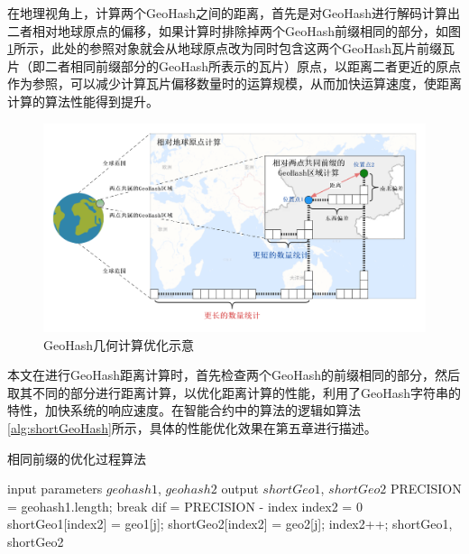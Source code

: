 在地理视角上，计算两个GeoHash之间的距离，首先是对GeoHash进行解码计算出二者相对地球原点的偏移，如果计算时排除掉两个GeoHash前缀相同的部分，如图\ref{fig:calBetter}所示，此处的参照对象就会从地球原点改为同时包含这两个GeoHash瓦片前缀瓦片（即二者相同前缀部分的GeoHash所表示的瓦片）原点，以距离二者更近的原点作为参照，可以减少计算瓦片偏移数量时的运算规模，从而加快运算速度，使距离计算的算法性能得到提升。\par

\begin{figure}
  \centering
  \includegraphics[width=1.0\textwidth]{figures/GeoHash计算优化}
  \caption{GeoHash几何计算优化示意}\label{fig:calBetter}
\end{figure}

本文在进行GeoHash距离计算时，首先检查两个GeoHash的前缀相同的部分，然后取其不同的部分进行距离计算，以优化距离计算的性能，利用了GeoHash字符串的特性，加快系统的响应速度。在智能合约中的算法的逻辑如算法\ref{alg:shortGeoHash}所示，具体的性能优化效果在第五章进行描述。\par

\begin{algorithm}[t]
  \caption{相同前缀的优化过程算法}
  \label{alg:shortGeoHash}
  \begin{algorithmic}[1]
  \REQUIRE input parameters $geohash1$, $geohash2$
  \ENSURE output $shortGeo1$, $shortGeo2$
  \STATE PRECISION = geohash1.length;
      \STATE break
    \ENDIF
  \ENDFOR
  \STATE dif = PRECISION - index
  \STATE index2 = 0
    \STATE shortGeo1[index2] = geo1[j];
    \STATE shortGeo2[index2] = geo2[j];
    \STATE index2++;
  \ENDFOR
  \RETURN shortGeo1, shortGeo2
  \end{algorithmic}
\end{algorithm}

